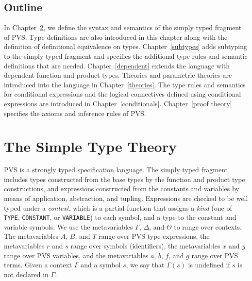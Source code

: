 \documentclass [12pt,twoside]{cslreport}
\begin{document}
\section{Outline}

In Chapter~\ref{simple}, we define the syntax and semantics of the simply
typed fragment of PVS.  Type definitions are also introduced in this
chapter along with the definition of definitional equivalence on types.
Chapter~\ref{subtypes} adds subtyping to the simply typed fragment and
specifies the additional type rules and semantic definitions that are
needed.  Chapter~\ref{dependent} extends the language with dependent
function and product types.  Theories and parametric theories are introduced
into the language in Chapter~\ref{theories}.  The type rules and semantics
for conditional expressions and the logical connectives defined using
conditional expressions are introduced in Chapter~\ref{conditionals}.
Chapter~\ref{proof theory} specifies the axioms and inference rules of
PVS\@.
 
\chapter{The Simple Type Theory}\label{simple}


PVS is a strongly typed specification language.  The simply typed fragment
includes types constructed from the base types by the function and product
type constructions, and expressions constructed from the constants and
variables by means of application, abstraction, and tupling.  Expressions
are checked to be well typed under a {\em context\/}, which is a partial
function that assigns a {\em kind\/} (one of \texttt{TYPE},
\texttt{CONSTANT}, or \texttt{VARIABLE}) to each symbol, and a type to the
constant and variable symbols.  We use the metavariables $\Gamma$,
$\Delta$, and $\Theta$ to range over contexts.  The metavariables $A$,
$B$, and $T$ range over PVS type expressions, the metavariables $r$ and
$s$ range 
over symbols (identifiers), the metavariables $x$ and $y$ range over PVS
variables, and the metavariables $a$, $b$, $f$, and $g$ range over PVS
terms.  Given 
a context $\Gamma$ and a symbol $s$, we say that $\Gamma(s)$ is
undefined if $s$ is not declared in $\Gamma$\@.
\end{document}
